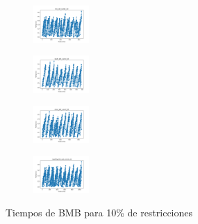 \begin{figure}[H]
\begin{subfigure}
        \centering
        \includegraphics[width=0.234\textwidth]{img/bmb/iris_set_const_10_3773969821_time.png}
    \end{subfigure}
    \hfill
    \begin{subfigure}
        \centering
        \includegraphics[width=0.234\textwidth]{img/bmb/ecoli_set_const_10_3773969821_time.png}
    \end{subfigure}
    \hfill
    \begin{subfigure}
        \centering
        \includegraphics[width=0.234\textwidth]{img/bmb/rand_set_const_10_3773969821_time.png}
    \end{subfigure}
    \hfill
    \begin{subfigure}
        \centering
        \includegraphics[width=0.234\textwidth]{img/bmb/newthyroid_set_const_10_3773969821_time.png}
    \end{subfigure}
    \caption{Tiempos de BMB para 10\% de restricciones}
\end{figure}

\vspace*{\fill}
\newpage
\vspace*{\fill}

